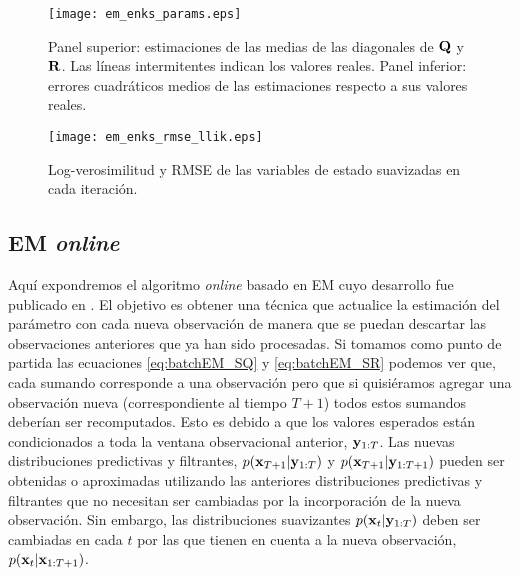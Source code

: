 \begin{figure}[h]
    \centering
    \texttt{[image: em\_enks\_params.eps]}
    \caption{Panel superior: estimaciones de las medias de las diagonales de $\mathbf{Q}$ y $\mathbf{R}$. Las líneas intermitentes indican los valores reales. Panel inferior: errores cuadráticos medios de las estimaciones respecto a sus valores reales.}
    \label{fig:em_enks_params}
\end{figure}

\begin{figure}[h]
    \centering
    \texttt{[image: em\_enks\_rmse\_llik.eps]}
    \caption{Log-verosimilitud y RMSE de las variables de estado suavizadas en cada iteración.}
    \label{fig:em_enks_rmse_llik}
\end{figure}

\subsection{EM \textit{online}} \label{sec:onlineEM}

Aquí expondremos el algoritmo \textit{online} basado en EM cuyo desarrollo fue publicado en \cite{Cocucci2021}. El objetivo es obtener una técnica que actualice la estimación del parámetro con cada nueva observación de manera que se puedan descartar las observaciones anteriores que ya han sido procesadas. Si tomamos como punto de partida las ecuaciones \ref{eq:batchEM_SQ} y \ref{eq:batchEM_SR} podemos ver que, cada sumando corresponde a una observación pero que si quisiéramos agregar una observación nueva (correspondiente al tiempo $T+1$) todos estos sumandos deberían ser recomputados. Esto es debido a que los valores esperados están condicionados a toda la ventana observacional anterior, $\mathbf{y}_{1:T}$. Las nuevas distribuciones predictivas y filtrantes, $p(\mathbf{x}_{T+1} | \mathbf{y}_{1:T})$ y $p(\mathbf{x}_{T+1} | \mathbf{y}_{1:T+1})$ pueden ser obtenidas o aproximadas utilizando las anteriores distribuciones predictivas y filtrantes que no necesitan ser cambiadas por la incorporación de la nueva observación. Sin embargo, las distribuciones suavizantes $p(\mathbf{x}_t | \mathbf{y}_{1:T})$ deben ser cambiadas en cada $t$ por las que tienen en cuenta a la nueva observación, $p(\mathbf{x}_t | \mathbf{x}_{1:T+1})$.

